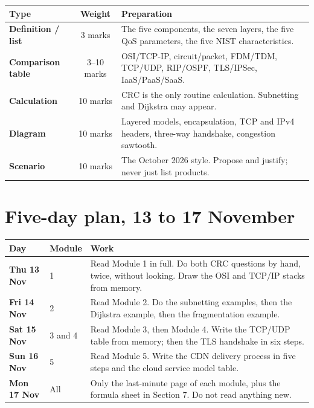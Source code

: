 \documentclass[11pt,a4paper]{article}
\begin{document}
\begin{center}\small
\begin{tabularx}{\textwidth}{>{\bfseries}p{} c X}
\toprule Type & Weight & Preparation\\
\midrule
Definition / list & 3 marks & The five components, the seven layers, the five QoS parameters, the five NIST characteristics.\\
Comparison table & 3--10 marks & OSI/TCP-IP, circuit/packet, FDM/TDM, TCP/UDP, RIP/OSPF, TLS/IPSec, IaaS/PaaS/SaaS.\\
Calculation & 10 marks & CRC is the only routine calculation. Subnetting and Dijkstra may appear.\\
Diagram & 10 marks & Layered models, encapsulation, TCP and IPv4 headers, three-way handshake, congestion sawtooth.\\
Scenario & 10 marks & The October 2026 style. Propose and justify; never just list products.\\
\bottomrule
\end{tabularx}
\end{center}

\section{Five-day plan, 13 to 17 November}

\begin{center}\small
\begin{tabularx}{\textwidth}{>{\bfseries}p{} p{} X}
\toprule Day & Module & Work\\
\midrule
Thu 13 Nov & 1 & Read Module 1 in full. Do both CRC questions by hand, twice, without looking. Draw the OSI and TCP/IP stacks from memory.\\
Fri 14 Nov & 2 & Read Module 2. Do the subnetting examples, then the Dijkstra example, then the fragmentation example.\\
Sat 15 Nov & 3 and 4 & Read Module 3, then Module 4. Write the TCP/UDP table from memory; then the TLS handshake in six steps.\\
Sun 16 Nov & 5 & Read Module 5. Write the CDN delivery process in five steps and the cloud service model table.\\
Mon 17 Nov & All & Only the last-minute page of each module, plus the formula sheet in Section 7. Do not read anything new.\\
\bottomrule
\end{tabularx}
\end{center}
\end{document}
